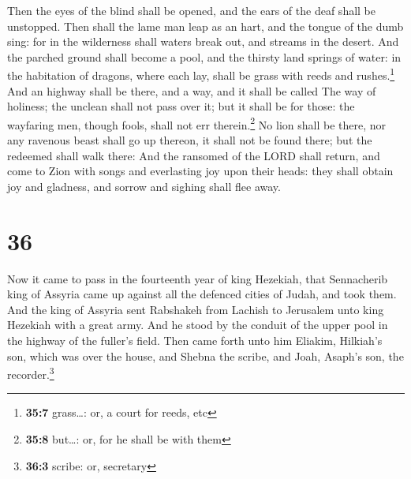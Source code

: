  Then the eyes of the blind shall be opened, and the ears
of the deaf shall be unstopped.  Then shall the lame man
leap as an hart, and the tongue of the dumb sing: for in the wilderness
shall waters break out, and streams in the desert.  And
the parched ground shall become a pool, and the thirsty land springs of
water: in the habitation of dragons, where each lay, shall be grass with
reeds and rushes.\footnote{\textbf{35:7} grass\ldots: or, a court for
  reeds, etc}  And an highway shall be there, and a way,
and it shall be called The way of holiness; the unclean shall not pass
over it; but it shall be for those: the wayfaring men, though fools,
shall not err therein.\footnote{\textbf{35:8} but\ldots: or, for he
  shall be with them}  No lion shall be there, nor any
ravenous beast shall go up thereon, it shall not be found there; but the
redeemed shall walk there:  And the ransomed of the LORD
shall return, and come to Zion with songs and everlasting joy upon their
heads: they shall obtain joy and gladness, and sorrow and sighing shall
flee away.

\hypertarget{section-35}{%
\section{36}\label{section-35}}

 Now it came to pass in the fourteenth year of king
Hezekiah, that Sennacherib king of Assyria came up against all the
defenced cities of Judah, and took them.  And the king of
Assyria sent Rabshakeh from Lachish to Jerusalem unto king Hezekiah with
a great army. And he stood by the conduit of the upper pool in the
highway of the fuller's field.  Then came forth unto him
Eliakim, Hilkiah's son, which was over the house, and Shebna the scribe,
and Joah, Asaph's son, the recorder.\footnote{\textbf{36:3} scribe: or,
  secretary}

